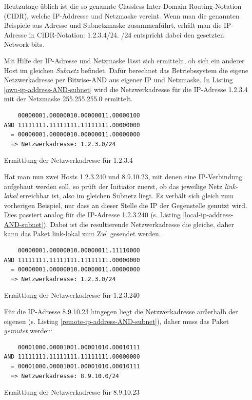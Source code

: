 Heutzutage üblich ist die so genannte Classless Inter-Domain Routing-Notation (\gls{CIDR}), welche IP-Addresse und Netzmaske vereint. Wenn man die genannten Beispiele aus Adresse und Subnetzmaske zusammenführt, erhält man die IP-Adresse in CIDR-Notation: 1.2.3.4/24. /24 entspricht dabei den gesetzten Network bits.

Mit Hilfe der IP-Adresse und Netzmaske lässt sich ermitteln, ob sich ein anderer Host im gleichen \textit{Subnetz} befindet. Dafür berechnet das Betriebssystem die eigene Netzwerkadresse per Bitwise-AND aus eigener IP und Netzmaske. In Listing \ref{own-ip-address-AND-subnet} wird die Netzwerkadresse für die IP-Adresse 1.2.3.4 mit der Netzmaske 255.255.255.0 ermittelt.
\begin{listing}[h]
\begin{verbatim}
    00000001.00000010.00000011.00000100
AND 11111111.11111111.11111111.00000000
  = 00000001.00000010.00000011.00000000
  => Netzwerkadresse: 1.2.3.0/24
\end{verbatim}
\caption{Ermittlung der Netzwerkadresse für 1.2.3.4}
\label{own-ip-address-AND-subnet}
\end{listing}\FloatBarrier
Hat man nun zwei Hosts 1.2.3.240 und 8.9.10.23, mit denen eine IP-Verbindung aufgebaut werden soll, so prüft der Initiator zuerst, ob das jeweilige Netz \textit{link-lokal} erreichbar ist, also im gleichen Subnetz liegt. Es verhält sich gleich zum vorherigen Beispiel, nur dass an dieser Stelle die IP der Gegenstelle genutzt wird.\\
Dies passiert analog für die IP-Adresse 1.2.3.240 (s. Listing \ref{local-ip-address-AND-subnet}). Dabei ist die resultierende Netzwerkadresse die gleiche, daher kann das Paket link-lokal zum Ziel gesendet werden.

\begin{listing}[h]
\begin{verbatim}
    00000001.00000010.00000011.11110000
AND 11111111.11111111.11111111.00000000
  = 00000001.00000010.00000011.00000000
  => Netzwerkadresse: 1.2.3.0/24
\end{verbatim}
\caption{Ermittlung der Netzwerkadresse für 1.2.3.240}
\label{local-ip-address-AND-subnet}
\end{listing}\FloatBarrier

Für die IP-Adresse 8.9.10.23\label{ip_ausserhalb} hingegen liegt die Netzwerkadresse außerhalb der eigenen (s. Listing \ref{remote-ip-address-AND-subnet}), daher muss das Paket \textit{geroutet} werden:
\begin{listing}[h]
\begin{verbatim}
    00001000.00001001.00001010.00010111
AND 11111111.11111111.11111111.00000000
  = 00001000.00001001.00001010.00010111
  => Netzwerkadresse: 8.9.10.0/24
\end{verbatim}
\caption{Ermittlung der Netzwerkadresse für 8.9.10.23}
\label{remote-ip-address-AND-subnet}
\end{listing}\FloatBarrier

